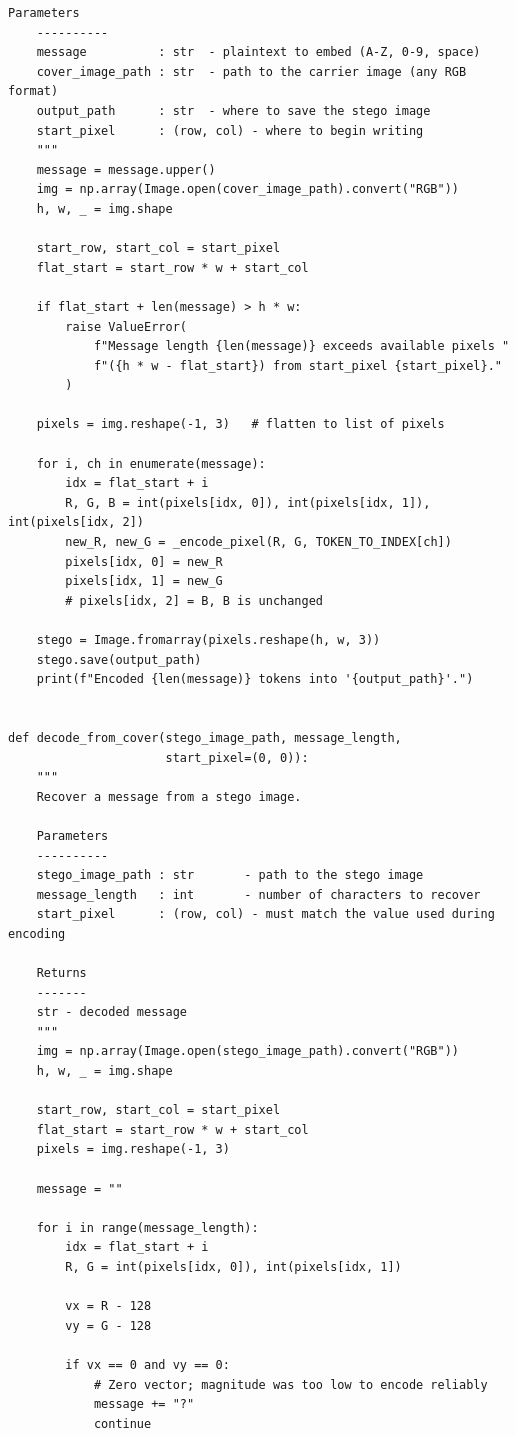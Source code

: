 \documentclass[12pt]{article}
\begin{document}
\begin{lstlisting}[caption={Cover-image encoder and decoder
(\texttt{method.py})}, label={lst:cover}]
    Parameters
    ----------
    message          : str  - plaintext to embed (A-Z, 0-9, space)
    cover_image_path : str  - path to the carrier image (any RGB format)
    output_path      : str  - where to save the stego image
    start_pixel      : (row, col) - where to begin writing
    """
    message = message.upper()
    img = np.array(Image.open(cover_image_path).convert("RGB"))
    h, w, _ = img.shape

    start_row, start_col = start_pixel
    flat_start = start_row * w + start_col

    if flat_start + len(message) > h * w:
        raise ValueError(
            f"Message length {len(message)} exceeds available pixels "
            f"({h * w - flat_start}) from start_pixel {start_pixel}."
        )

    pixels = img.reshape(-1, 3)   # flatten to list of pixels

    for i, ch in enumerate(message):
        idx = flat_start + i
        R, G, B = int(pixels[idx, 0]), int(pixels[idx, 1]), int(pixels[idx, 2])
        new_R, new_G = _encode_pixel(R, G, TOKEN_TO_INDEX[ch])
        pixels[idx, 0] = new_R
        pixels[idx, 1] = new_G
        # pixels[idx, 2] = B, B is unchanged

    stego = Image.fromarray(pixels.reshape(h, w, 3))
    stego.save(output_path)
    print(f"Encoded {len(message)} tokens into '{output_path}'.")


def decode_from_cover(stego_image_path, message_length,
                      start_pixel=(0, 0)):
    """
    Recover a message from a stego image.

    Parameters
    ----------
    stego_image_path : str       - path to the stego image
    message_length   : int       - number of characters to recover
    start_pixel      : (row, col) - must match the value used during encoding

    Returns
    -------
    str - decoded message
    """
    img = np.array(Image.open(stego_image_path).convert("RGB"))
    h, w, _ = img.shape

    start_row, start_col = start_pixel
    flat_start = start_row * w + start_col
    pixels = img.reshape(-1, 3)

    message = ""

    for i in range(message_length):
        idx = flat_start + i
        R, G = int(pixels[idx, 0]), int(pixels[idx, 1])

        vx = R - 128
        vy = G - 128

        if vx == 0 and vy == 0:
            # Zero vector; magnitude was too low to encode reliably
            message += "?"
            continue


\end{lstlisting}
\end{document}
